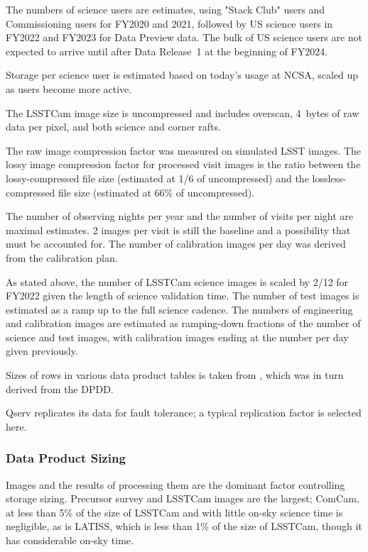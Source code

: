 The numbers of science users are estimates, using "Stack Club" users and Commissioning users for FY2020 and 2021, followed by US science users in FY2022 and FY2023 for Data Preview data.
The bulk of US science users are not expected to arrive until after Data Release~1 at the beginning of FY2024.

Storage per science user is estimated based on today's usage at NCSA, scaled up as users become more active.

The LSSTCam image size is uncompressed and includes overscan, 4~bytes of raw data per pixel, and both science and corner rafts.

The raw image compression factor was measured on simulated LSST images.
The lossy image compression factor for processed visit images is the ratio between the lossy-compressed file size (estimated at 1/6 of uncompressed) and the lossless-compressed file size (estimated at 66\% of uncompressed).

The number of observing nights per year and the number of visits per night are maximal estimates.
2 images per visit is still the baseline and a possibility that must be accounted for.
The number of calibration images per day was derived from the calibration plan.

As stated above, the number of LSSTCam science images is scaled by 2/12 for FY2022 given the length of science validation time.
The number of test images is estimated as a ramp up to the full science cadence.
The numbers of engineering and calibration images are estimated as ramping-down fractions of the number of science and test images, with calibration images ending at the number per day given previously.

Sizes of rows in various data product tables is taken from , which was in turn derived from the DPDD.

Qserv replicates its data for fault tolerance; a typical replication factor is selected here.

\subsubsection{Data Product Sizing}
Images and the results of processing them are the dominant factor controlling storage sizing.
Precursor survey and LSSTCam images are the largest; ComCam, at less than 5\% of the size of LSSTCam and with little on-sky science time is negligible, as is LATISS, which is less than 1\% of the size of LSSTCam, though it has considerable on-sky time.

